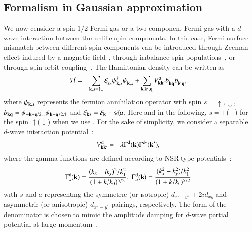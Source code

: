 \documentclass[aps,prd,amsmath,two column,nofootinbib,amssymb,referee]{revtex4}
\begin{document}
\subsection{Formalism in Gaussian approximation}\label{sectiondA}
We now consider a spin-$1/2$ Fermi gas or a two-component Fermi gas with a $d$-wave interaction between the unlike spin components. In this case, Fermi surface mismatch between different spin components can be introduced through Zeeman effect
induced by a magnetic field~\cite{Sarma,LO,FF,Takada}, through imbalance spin populations~\cite{Zwierlein2006,Partridge2006,Sheehy2006}, or through spin-orbit coupling~\cite{Zhai:2014gna}. The Hamiltonian density can be written as~\cite{Botelho2005b}
\begin{eqnarray}
{\cal H}&=&\sum_{{\bf k},s=\uparrow\downarrow}\xi_{{\bf k}s}^{\phantom{\dag}}\psi_{{\bf k},s}^\dagger\psi_{{\bf k},s}^{\phantom{\dag}}
+\sum_{{\bf k,k',q}}V_{{\bf kk'}}^{\rm d}b_{{\bf kq}}^\dagger b_{{\bf k'q}}^{\phantom{\dag}},
\end{eqnarray}
where $\psi_{{\bf k},s}$ represents the fermion annihilation operator with spin $s=\uparrow,\downarrow$, $b_{{\bf kq}}=\psi_{{\bf -k+q}/2,\downarrow}\psi_{{\bf k+q}/2,\uparrow}$ and $\xi_{{\bf k}s}=\xi_{{\bf k}}-s\delta\mu$. Here and in the following, $s=+$($-$) for the spin $\uparrow$($\downarrow$) when we use . For the sake of simplicity, we consider a separable $d$-wave interaction potential~\cite{Cao2013}:
\begin{eqnarray}
V_{{\bf kk'}}^{\rm d}=-\lambda\Gamma^{\rm d}({\bf k})\Gamma^{\rm d*}({\bf k'}),
\end{eqnarray}
where the gamma functions are defined according to NSR-type potentials~\cite{Botelho2005a}:
\begin{eqnarray}
\Gamma^{\rm d}_s({\bf k})={(k_x+ik_y)^2/k_1^2\over(1+k/k_0)^{5/2}},\ \Gamma^{\rm d}_a({\bf k})={(k_x^2-k_y^2)/k_1^2\over(1+k/k_0)^{5/2}}
\end{eqnarray}
with $s$ and $a$ representing the symmetric (or isotropic) $d_{x^2-y^2}+2id_{xy}$ and asymmetric (or anisotropic) $d_{x^2-y^2}$ pairings, respectively. The form of the denominator is chosen to mimic the amplitude damping for $d$-wave partial potential at large momentum~\cite{Botelho2005a}.
\end{document}
